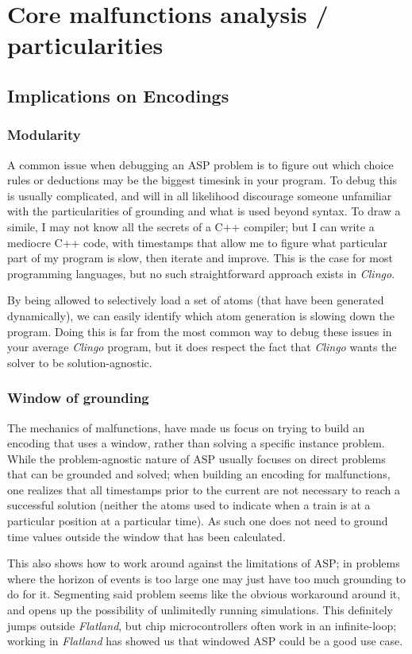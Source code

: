 \section{Core malfunctions analysis / particularities}
\subsection{Implications on Encodings}

\subsubsection{Modularity}
A common issue when debugging an ASP problem is to figure out which choice rules or deductions may be the biggest timesink in your program. To debug this is usually complicated, and will in all likelihood discourage someone unfamiliar with the particularities of grounding and what is used beyond syntax. To draw a simile, I may not know all the secrets of a C++ compiler; but I can write a mediocre C++ code, with timestamps that allow me to figure what particular part of my program is slow, then iterate and improve. This is the case for most programming languages, but no such straightforward approach exists in \textit{Clingo}.

By being allowed to selectively load a set of atoms (that have been generated dynamically), we can easily identify which atom generation is slowing down the program. Doing this is far from the most common way to debug these issues in your average \textit{Clingo} program, but it does respect the fact that \textit{Clingo} wants the solver to be solution-agnostic. 


\subsubsection{Window of grounding}
\label{sec:window}
The mechanics of malfunctions, have made us focus on trying to build an encoding that uses a window, rather than solving a specific instance problem. While the problem-agnostic nature of ASP usually focuses on direct problems that can be grounded and solved; when building an encoding for malfunctions, one realizes that all timestamps prior to the current are not necessary to reach a successful solution (neither the atoms used to indicate when a train is at a particular position at a particular time). As such one does not need to ground time values outside the window that has been calculated. 

This also shows how to work around against the limitations of ASP; in problems where the horizon of events is too large one may just have too much grounding to do for it. Segmenting said problem seems like the obvious workaround around it, and opens up the possibility of unlimitedly running simulations. This definitely jumps outside \textit{Flatland}, but chip microcontrollers often work in an infinite-loop; working in \textit{Flatland} has showed us that windowed ASP could be a good use case.
  

